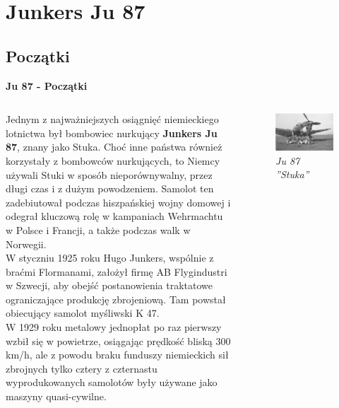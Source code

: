 \section{\large{\textbf{Junkers Ju 87}}}

\subsection{Początki}


\begin{frame}{\Huge{\textbf{Ju 87 - Początki}}}
	\begin{columns}[t]
			\justifying
			
Jednym z najważniejszych osiągnięć niemieckiego lotnictwa był bombowiec nurkujący \textbf{Junkers Ju 87}, znany jako Stuka. Choć inne państwa również korzystały z bombowców nurkujących, to Niemcy używali Stuki w sposób nieporównywalny, przez długi czas i z dużym powodzeniem. Samolot ten zadebiutował podczas hiszpańskiej wojny domowej i odegrał kluczową rolę w kampaniach Wehrmachtu w Polsce i Francji, a także podczas walk w Norwegii. \\
W styczniu 1925 roku Hugo Junkers, wspólnie z braćmi Flormanami, założył firmę AB Flygindustri w Szwecji, aby obejść postanowienia traktatowe ograniczające produkcję zbrojeniową. Tam powstał obiecujący samolot myśliwski K 47. \\
W 1929 roku metalowy jednopłat po raz pierwszy wzbił się w powietrze, osiągając prędkość bliską 300 km/h, ale z powodu braku funduszy niemieckich sił zbrojnych tylko cztery z czternastu wyprodukowanych samolotów były używane jako maszyny quasi-cywilne.

			\begin{figure}
				\centering
				\includegraphics[scale=1.9]{images/ju87-01.jpg}	
				\caption{\textit{Ju 87 ''Stuka''}}
			\end{figure}
	\end{columns}
\end{frame}


